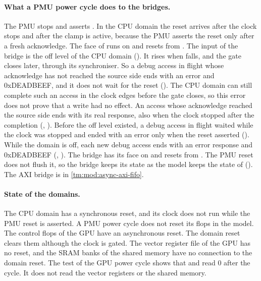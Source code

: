 \paragraph{What a PMU power cycle does to the bridges.} The PMU stops  and asserts . In the CPU domain the reset arrives after the clock stops and after the clamp is active, because the PMU asserts the reset only after a fresh acknowledge. The  face of  runs on  and resets from . The input  of the bridge is the off level of the CPU domain (). It rises when  falls, and the gate  closes later, through its synchroniser. So a debug access in flight whose acknowledge has not reached the source side ends with an error and 0xDEADBEEF, and it does not wait for the reset (). The CPU domain can still complete such an access in the clock edges before the gate closes, so this error does not prove that a write had no effect. An access whose acknowledge reached the source side ends with its real response, also when the clock stopped after the completion (, ). Before the off level existed, a debug access in flight waited while the clock was stopped and ended with an error only when the reset asserted (). While the domain is off, each new debug access ends with an error response and 0xDEADBEEF (, ). The bridge  has its  face on  and resets from . The PMU reset does not flush it, so the bridge keeps its state as the model keeps the state of  (). The AXI bridge is in \cref{tm:mod:async-axi-fifo}.

\paragraph{State of the domains.} The CPU domain has a synchronous reset, and its clock does not run while the PMU reset is asserted. A PMU power cycle does not reset its flops in the model. The control flops of the GPU have an asynchronous reset. The domain reset clears them although the clock is gated. The vector register file of the GPU has no reset, and the SRAM banks of the shared memory have no connection to the domain reset. The test of the GPU power cycle shows that  and  read 0 after the cycle. It does not read the vector registers or the shared memory.

